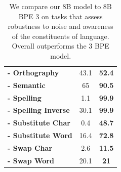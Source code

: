 \begin{table}[t]
\begin{tabular}{@{}lcc@{}}
        \hspace{0.5cm}\textbf{- Orthography}      & 43.1	      & \textbf{52.4} \\
        \hspace{0.5cm}\textbf{- Semantic}         & 65	          & \textbf{90.5} \\
        \hspace{0.5cm}\textbf{- Spelling}         & 1.1	          & \textbf{99.9} \\
        \hspace{0.5cm}\textbf{- Spelling Inverse} & 30.1	      & \textbf{99.9} \\
        \hspace{0.5cm}\textbf{- Substitute Char}  & 0.4	          & \textbf{48.7} \\
        \hspace{0.5cm}\textbf{- Substitute Word}  & 16.4	      & \textbf{72.8} \\
        \hspace{0.5cm}\textbf{- Swap Char}        & 2.6	          & \textbf{11.5} \\
        \hspace{0.5cm}\textbf{- Swap Word}        & 20.1	      & \textbf{21} \\

\bottomrule

\end{tabular}
\caption{We compare our 8B \model{} model to 8B BPE \llama{} 3 on tasks that assess robustness to noise and awareness of the constituents of language. Overall \model{} outperforms the \llama{} 3 BPE model.}
\label{tab:char_tasks}
\end{table}